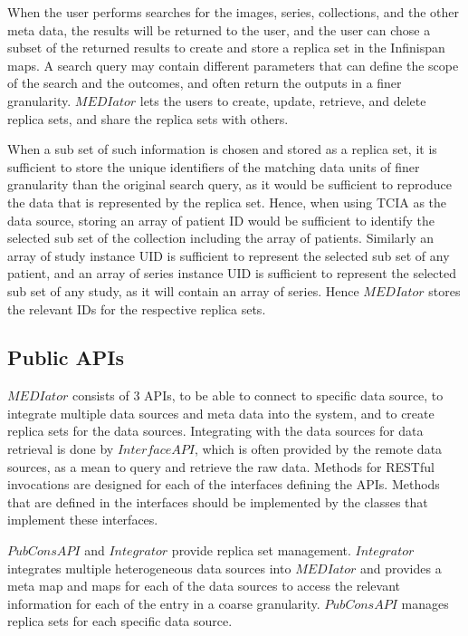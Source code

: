 \documentclass[letterpaper, 10 pt, conference]{ieeeconf}  %
\begin{document}
When the user performs searches for the images, series, collections, and the other meta data, the results will be returned to the user, and the user can chose a subset of the returned results to create and store a replica set in  the Infinispan maps. A search query may contain different parameters that can define the scope of the search and the outcomes, and often return the outputs in a finer granularity. $MEDIator$ lets the users to create, update, retrieve, and delete replica sets, and share the replica sets with others.

When a sub set of such information is chosen and stored as a replica set, it is sufficient to store the unique identifiers of the matching data units of finer granularity than the original search query, as it would be sufficient to reproduce the data that is represented by the replica set. Hence, when using TCIA as the data source, storing an array of patient ID would be sufficient to identify the selected sub set of the collection including the array of patients. Similarly an array of study instance UID is sufficient to represent the selected sub set of any patient, and an array of series instance UID is sufficient to represent the selected sub set of any study, as it will contain an array of series. Hence $MEDIator$ stores the relevant IDs for the respective replica sets.

\subsection{Public APIs}
$MEDIator$ consists of 3 APIs, to be able to connect to specific data source, to integrate multiple data sources and meta data into the system, and to create replica sets for the data sources. Integrating with the data sources for data retrieval is done by $InterfaceAPI$, which is often provided by the remote data sources, as a mean to query and retrieve the raw data. Methods for RESTful invocations are designed for each of the interfaces defining the APIs. Methods that are defined in the interfaces should be implemented by the classes that implement these interfaces. 

$PubConsAPI$ and $Integrator$ provide replica set management. $Integrator$ integrates multiple heterogeneous data sources into $MEDIator$ and provides a meta map and maps for each of the data sources to access the relevant information for each of the entry in a coarse granularity. $PubConsAPI$ manages replica sets for each specific data source.  
\end{document}

